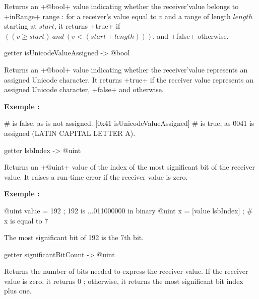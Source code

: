 {Returns an \ggs+@bool+ value indicating whether the receiver'value belongs to \ggs+inRange+ range : for a receiver's value equal to $v$ and a range of length $length$ starting at $start$, it returns \ggs+true+ if $((v \geqslant start)~and~(v<(start+length)))$, and \ggs+false+ otherwise.




\begin{galgas}
getter isUnicodeValueAssigned -> @bool
\end{galgas}

Returns an \ggs+@bool+ value indicating whether the receiver'value represents an assigned Unicode character. It returns \ggs+true+ if the receiver value represents an assigned Unicode character, \ggs+false+ and otherwise.

\textbf{Exemple :}
\begin{galgas}
 # is false, as \uFFFF is not assigned.
[0x41 isUnicodeValueAssigned] # is true, as \u0041 is assigned (LATIN CAPITAL LETTER A).
\end{galgas}




\begin{galgas}
getter lsbIndex -> @uint
\end{galgas}

Returns an \ggs+@uint+ value of the index of the most significant bit of the receiver value. It raises a run-time error if the receiver value is zero.

\textbf{Exemple :}
\begin{galgas}
@uint value = 192 ; 192 is ...011000000 in binary
@uint x = [value lsbIndex] ; # x is equal to 7
\end{galgas}

The most significant bit of 192 is the 7th bit.





\begin{galgas}
getter significantBitCount -> @uint
\end{galgas}

Returns the number of bits needed to express the receiver value. If the receiver value is zero, it returns 0 ; otherwise, it returns the most significant bit index plus one.

}
